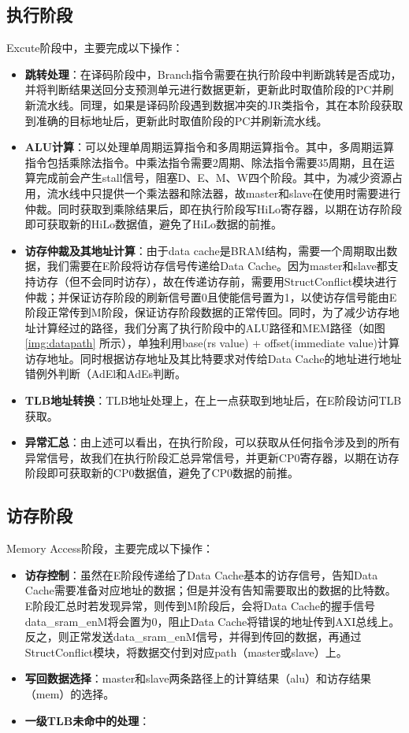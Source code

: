 \subsection{执行阶段}
Excute阶段中，主要完成以下操作：
\begin{itemize}
    \item \textbf{跳转处理}：在译码阶段中，Branch指令需要在执行阶段中判断跳转是否成功，并将判断结果送回分支预测单元进行数据更新，更新此时取值阶段的PC并刷新流水线。同理，如果是译码阶段遇到数据冲突的JR类指令，其在本阶段获取到准确的目标地址后，更新此时取值阶段的PC并刷新流水线。
    \item \textbf{ALU计算}：可以处理单周期运算指令和多周期运算指令。其中，多周期运算指令包括乘除法指令。\cpuname 中乘法指令需要2周期、除法指令需要35周期，且在运算完成前会产生stall信号，阻塞D、E、M、W四个阶段。其中，为减少资源占用，流水线中只提供一个乘法器和除法器，故master和slave在使用时需要进行仲裁。同时获取到乘除结果后，即在执行阶段写HiLo寄存器，以期在访存阶段即可获取新的HiLo数据值，避免了HiLo数据的前推。
    \item \textbf{访存仲裁及其地址计算}：由于data cache是BRAM结构，需要一个周期取出数据，我们需要在E阶段将访存信号传递给Data Cache。因为master和slave都支持访存（但不会同时访存），故在传递访存前，需要用StructConflict模块进行仲裁；并保证访存阶段的刷新信号置0且使能信号置为1，以使访存信号能由E阶段正常传到M阶段，保证访存阶段数据的正常传回。同时，为了减少访存地址计算经过的路径，我们分离了执行阶段中的ALU路径和MEM路径（如图 \ref{img:datapath} 所示），单独利用base(rs value) + offset(immediate value)计算访存地址。同时根据访存地址及其比特要求对传给Data Cache的地址进行地址错例外判断（AdEl和AdEs判断。
    \item \textbf{TLB地址转换}：\todo TLB地址处理上，在上一点获取到地址后，在E阶段访问TLB获取。
    \item \textbf{异常汇总}：由上述可以看出，在执行阶段，可以获取从任何指令涉及到的所有异常信号，故我们在执行阶段汇总异常信号，并更新CP0寄存器，以期在访存阶段即可获取新的CP0数据值，避免了CP0数据的前推。
\end{itemize}

\subsection{访存阶段}
Memory Access阶段，主要完成以下操作：

\begin{itemize}
    \item \textbf{访存控制}：虽然在E阶段传递给了Data Cache基本的访存信号，告知Data Cache需要准备对应地址的数据；但是并没有告知需要取出的数据的比特数。E阶段汇总时若发现异常，则传到M阶段后，会将Data Cache的握手信号data\_sram\_enM将会置为0，阻止Data Cache将错误的地址传到AXI总线上。反之，则正常发送data\_sram\_enM信号，并得到传回的数据，再通过StructConflict模块，将数据交付到对应path（master或slave）上。
    \item \textbf{写回数据选择}：master和slave两条路径上的计算结果（alu）和访存结果（mem）的选择。
    \item \textbf{一级TLB未命中的处理}：\todo
\end{itemize}

